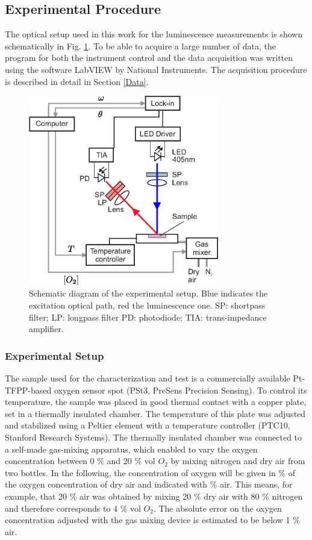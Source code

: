 \documentclass[sensors,article,submit,moreauthors,pdftex,10pt,a4paper]{Definitions/mdpi}
\begin{document}
\subsection{Experimental Procedure}
\label{Experimental}

The optical setup used in this work for the luminescence measurements is shown schematically in Fig. \ref{fig:setup}. To be able to acquire a large number of data, the program for both the instrument control and the data acquisition was written using the software LabVIEW by National Instruments. The acquisition procedure is described in detail in Section \ref{Data}.

\begin{figure}[t!]
\centering
\includegraphics[keepaspectratio, width=8.3cm]{Setup_auto.eps}
\caption{Schematic diagram of the experimental setup. Blue indicates the excitation optical path, red the luminescence one. SP: shortpass filter; LP: longpass filter PD: photodiode; TIA: trans-impedance amplifier.}
\label{fig:setup}
\end{figure}


\subsubsection{Experimental Setup}

The sample used for the characterization and test is a commercially available Pt-TFPP-based oxygen sensor spot (PSt3, PreSens Precision Sensing).
To control its temperature, the sample was placed in good thermal contact with a copper plate, set in a thermally insulated chamber. The temperature of this plate was adjusted and stabilized using a Peltier element with a temperature controller (PTC10, Stanford Research Systems). The thermally insulated chamber was connected to a self-made gas-mixing apparatus, which enabled to vary the oxygen concentration between 0 $\%$ and 20 $\%$ vol $O_2$ by mixing nitrogen and dry air from two bottles. In the following, the concentration of oxygen will be given in $\%$ of the oxygen concentration of dry air and indicated with $\%$ air. This means, for example, that 20 $\%$ air was obtained by mixing 20 $\%$ dry air with 80 $\%$ nitrogen and therefore corresponds to 4 $\%$ vol $O_2$. The absolute error on the oxygen concentration adjusted with the gas mixing device is estimated to be below 1 $\%$ air. 
 
\end{document}
